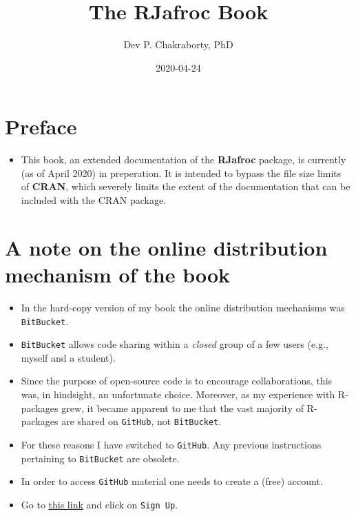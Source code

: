 \documentclass[
]{book}
\title{The RJafroc Book}
\author{Dev P. Chakraborty, PhD}
\date{2020-04-24}
\providecommand{\tightlist}{%
  \setlength{\itemsep}{0pt}\setlength{\parskip}{0pt}}
\begin{document}
\maketitle

{
\setcounter{tocdepth}{1}
\tableofcontents
}
\hypertarget{preface}{%
\chapter*{Preface}\label{preface}}

\begin{itemize}
\tightlist
\item
  This book, an extended documentation of the \textbf{RJafroc} package, is currently (as of April 2020) in preperation. It is intended to bypass the file size limits of \textbf{CRAN}, which severely limits the extent of the documentation that can be included with the CRAN package.
\end{itemize}

\hypertarget{a-note-on-the-online-distribution-mechanism-of-the-book}{%
\chapter*{A note on the online distribution mechanism of the book}\label{a-note-on-the-online-distribution-mechanism-of-the-book}}

\begin{itemize}
\tightlist
\item
  In the hard-copy version of my book \citep{RN2680} the online distribution mechanisms was \texttt{BitBucket}.
\item
  \texttt{BitBucket} allows code sharing within a \emph{closed} group of a few users (e.g., myself and a student).
\item
  Since the purpose of open-source code is to encourage collaborations, this was, in hindsight, an unfortunate choice. Moreover, as my experience with R-packages grew, it became apparent to me that the vast majority of R-packages are shared on \texttt{GitHub}, not \texttt{BitBucket}.
\item
  For these reasons I have switched to \texttt{GitHub}. Any previous instructions pertaining to \texttt{BitBucket} are obsolete.
\item
  In order to access \texttt{GitHub} material one needs to create a (free) account.
\item
  Go to \href{https://github.com}{this link} and click on \texttt{Sign\ Up}.
\end{itemize}
\end{document}
